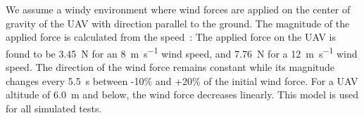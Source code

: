 \documentclass[conference]{IEEEtran}
\begin{document}


We assume a windy environment where %
wind forces are applied on the
center of gravity of the UAV with direction parallel to the ground. The magnitude of the applied force %
is calculated from the speed~\cite{Dynamic_pressure_NASA,anderson2010fundamentals}:
The applied force on the UAV is found
to be \SI{3.45}{\newton} for an \SI{8}{\m \per \s} wind speed, and 
\SI{7.76}{\newton} for a \SI{12}{\m \per \s}
wind speed. %
The direction of the wind force remains constant while its magnitude changes every \SI{5.5}{\second} between -10\% and +20\% of the initial wind force. %
For a UAV altitude of \SI{6.0}{\meter} and below, the wind force decreases linearly. This model is used for all simulated tests.
\end{document}
